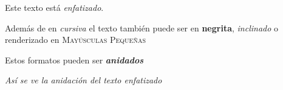 \documentclass{article}
\begin{document}
Este texto está \emph{enfatizado}.

Además de en \textit{cursiva} el texto también puede ser en \textbf{negrita},
\textsl{inclinado} o renderizado en \textsc{Mayúsculas Pequeñas}

Estos formatos pueden ser \textit{\textbf{anidados}}

\emph{Así se ve la \emph{anidación} del texto enfatizado}
\end{document}
